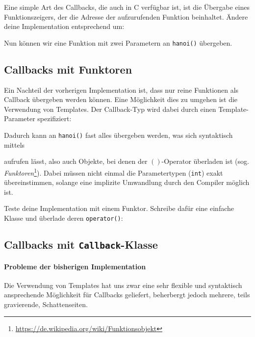 Eine simple Art des Callbacks, die auch in C verfügbar ist, ist die Übergabe eines Funktionszeigers, der die Adresse der aufzurufenden Funktion beinhaltet.
Ändere deine Implementation entsprechend um:


Nun können wir eine Funktion mit zwei Parametern an \lstinline{hanoi()} übergeben.


\subsection{Callbacks mit Funktoren}
Ein Nachteil der vorherigen Implementation ist, dass nur reine Funktionen als Callback übergeben werden können.
Eine Möglichkeit dies zu umgehen ist die Verwendung von Templates.
Der Callback-Typ wird dabei durch einen Template-Parameter spezifiziert:


Dadurch kann an \lstinline{hanoi()} fast alles übergeben werden, was sich syntaktisch mittels


aufrufen lässt, also auch Objekte, bei denen der $()$-Operator überladen ist (sog. \emph{Funktoren}\footnote{\url{https://de.wikipedia.org/wiki/Funktionsobjekt}}).
Dabei müssen nicht einmal die Parametertypen (\lstinline{int}) exakt übereinstimmen, solange eine implizite Umwandlung durch den Compiler möglich ist.

Teste deine Implementation mit einem Funktor.
Schreibe dafür eine einfache Klasse und überlade deren \lstinline{operator()}:


\subsection{Callbacks mit \lstinline{Callback}-Klasse}

\paragraph*{Probleme der bisherigen Implementation}
Die Verwendung von Templates hat uns zwar eine sehr flexible und syntaktisch ansprechende Möglichkeit für Callbacks geliefert, beherbergt jedoch mehrere, teils gravierende, Schattenseiten.

